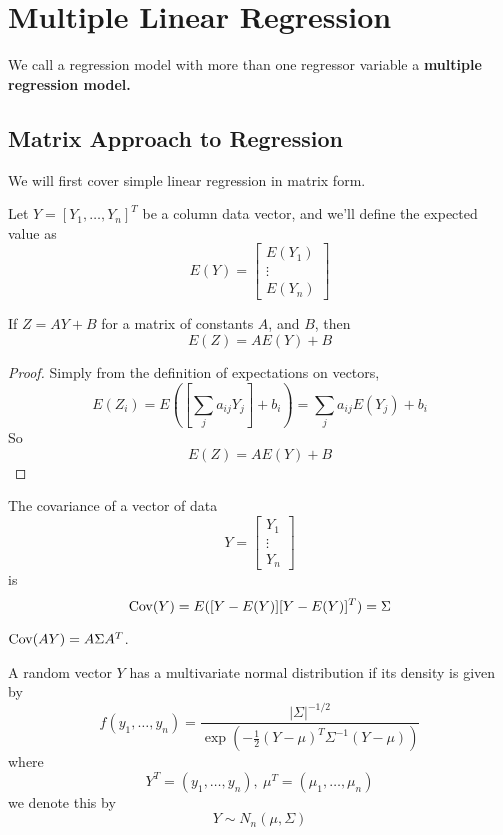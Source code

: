 \chapter{Multiple Linear Regression}

We call a regression model with more than one regressor variable a \textbf{multiple regression model.}

\section{Matrix Approach to Regression}

We will first cover simple linear regression in matrix form. 

Let $Y = [Y_1, \ldots, Y_n]^T$ be a column data vector, and we'll define the expected value as 
\[E(Y) = \begin{bmatrix}
    E(Y_1)\\ \vdots \\ E(Y_n)
\end{bmatrix}\]

\begin{prop}
    If $Z = AY + B$ for a matrix of constants $A$, and $B$, then 
    \[E(Z) = AE(Y) + B\]
\end{prop}
\begin{proof}
    Simply from the definition of expectations on vectors, 
    \[E(Z_i) = E\left(\left[\sum_j a_{ij}Y_j\right] + b_i\right) = \sum_j a_{ij}E(Y_j) + b_i\]
    So 
    \[E(Z) = AE(Y) + B\] 
\end{proof}

\begin{definition}
    The covariance of a vector of data 
    \[Y = \begin{bmatrix}
        Y_1\\ \vdots \\ Y_n
    \end{bmatrix}\]
    is 
    \[\operatorname{Cov}(Y) = E([Y - E(Y)][Y-E(Y)]^T) = \Sigma\]
\end{definition}

\begin{prop}
    $\operatorname{Cov}(AY) = A\Sigma A^T$. 
\end{prop}

\begin{definition}
    A random vector $Y$ has a multivariate normal distribution if its density is given by 
    \[f(y_1, \ldots, y_n) = \frac{|\Sigma|^{-1/2}}{\exp\left(-\frac{1}{2}(Y - \mu)^T\Sigma^{-1}(Y - \mu)\right)}\]
    where 
    \[Y^T = (y_1, \ldots, y_n), \ \mu^T = (\mu_1, \ldots, \mu_n)\]
    we denote this by 
    \[Y \sim N_n(\mu, \Sigma)\]
\end{definition}

